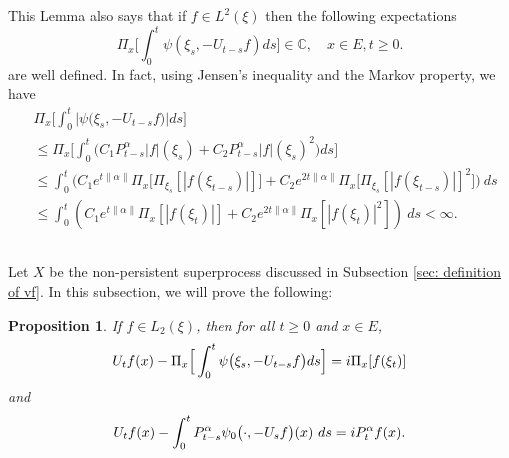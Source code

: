 \documentclass[12pt,a4paper]{amsart}
\theoremstyle{plain}
\newtheorem{prop}[thm]{Proposition}
\theoremstyle{definition}
\numberwithin{equation}{section}
\begin{document}
    This Lemma also says that if $f\in L^2(\xi)$ then the following expectations
\[
    \Pi_x\Big[\int_0^t \psi(\xi_s,- U_{t-s}f)ds\Big]
    \in \mathbb C,
    \quad x\in E, t\geq 0.
\]
    are well defined. 
    In fact, using Jensen's inequality and the Markov property, we have
\begin{equation}\begin{split}
\label{eq: domination of psi(v)}
    &\Pi_x\Big[\int_0^t \big|\psi \big(\xi_s,-U_{t-s}f\big)\big|ds\Big]
    \\&\leq \Pi_x\Big[\int_0^t \big(C_1 P_{t-s}^\alpha|f|(\xi_s)+C_2 P_{t-s}^\alpha|f|(\xi_s)^2\big)ds\Big]
    \\ &\leq \int_0^t \big(C_1 e^{t\|\alpha\|}\Pi_x \big[ \Pi_{\xi_s}[|f(\xi_{t-s})|] \big]+C_2 e^{2t\|\alpha\|}\Pi_x \big[ \Pi_{\xi_s}[|f (\xi_{t-s})|]^2 \big]\big)~ds
    \\ &\leq \int_0^t (C_1 e^{t\|\alpha\|}\Pi_x [ |f(\xi_{t})|]+C_2e^{2t\|\alpha\|}\Pi_x [ |f (\xi_{t})|^2 ])~ds < \infty.
\end{split}\end{equation}

\subsection{}
    Let $X$ be the non-persistent superprocess discussed in Subsection \ref{sec: definition of vf}.
    In this subsection, we will prove the following:
    \begin{prop}
\label{prop: complex FKPP-equation}
    If $f\in L_2(\xi)$,  then for all $t\geq 0$ and $x\in E$,
\begin{equation}
\label{eq: complex FKPP-equation}
    U_tf(x) - \Pi_x \Big[\int_0^t \psi\big(\xi_s, - U_{t-s}f\big) ds \Big]
    \\= i \Pi_x [f(\xi_t)]
\end{equation}
and
\begin{equation}
\label{eq: complex FKPP-equation with FK-transform}
    U_tf(x) -  \int_0^t P_{t-s}^{\alpha} \psi_0\big(\cdot,-U_sf\big) (x)~ds
   \\= iP_t^\alpha f(x).
\end{equation}
\end{prop}
\end{document}

